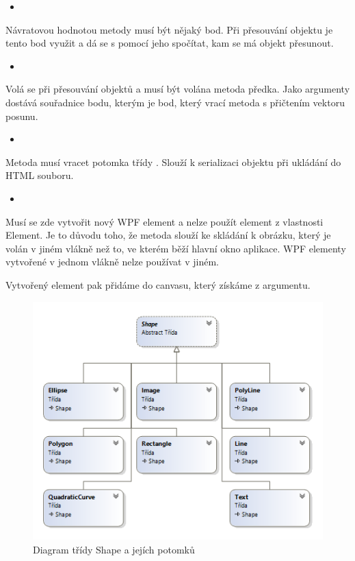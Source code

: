 \documentclass[
  field=inf,
  biblatex,
  glossaries,
  index
]{kidiplom}
\begin{document}
\begin{itemize}
\item {}
\end{itemize}
Návratovou hodnotou metody musí být nějaký bod. Při přesouvání objektu je tento bod využit a dá se s pomocí jeho spočítat, kam se má objekt přesunout.

\begin{itemize}
\item {}
\end{itemize}
Volá se při přesouvání objektů a musí být volána metoda předka. Jako argumenty dostává souřadnice bodu, kterým je bod, který vrací metoda  s přičtením vektoru posunu.

\begin{itemize}
\item {}
\end{itemize}
Metoda musí vracet potomka třídy . Slouží k serializaci objektu při ukládání do HTML souboru.

\begin{itemize}
\item {}
\end{itemize}
Musí se zde vytvořit nový WPF element a nelze použít element z vlastnosti Element. Je to důvodu toho, že metoda slouží ke skládání k obrázku, který je volán v jiném vlákně než to, ve kterém běží hlavní okno aplikace. WPF elementy vytvořené v jednom vlákně nelze používat v jiném.

Vytvořený element pak přidáme do canvasu, který získáme z argumentu.



\begin{figure}
\includegraphics[width=15cm]{img/shape_diag}
\caption{Diagram třídy Shape a jejích potomků}
\end{figure}  
\end{document}
